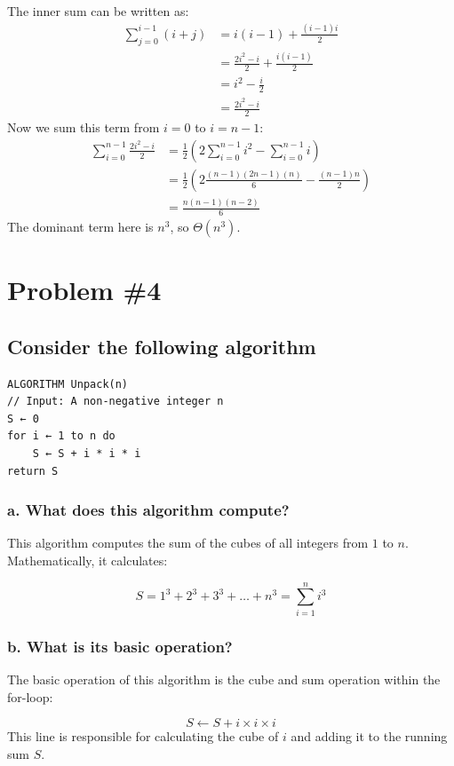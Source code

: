 \documentclass{article}
\begin{document}
The inner sum can be written as:
\[
\begin{aligned}
\sum_{{j=0}}^{{i-1}} (i+j) &= i(i-1) + \frac{(i-1)i}{2} \\
&= \frac{2i^2 - i}{2} + \frac{i(i-1)}{2} \\
&= i^2 - \frac{i}{2} \\
&= \frac{2i^2 - i}{2}
\end{aligned}
\]
Now we sum this term from \( i=0 \) to \( i=n-1 \):
\[
\begin{aligned}
\sum_{{i=0}}^{{n-1}} \frac{2i^2 - i}{2} &= \frac{1}{2} \left( 2\sum_{{i=0}}^{{n-1}} i^2 - \sum_{{i=0}}^{{n-1}} i \right) \\
&= \frac{1}{2} \left( 2\frac{(n-1)(2n-1)(n)}{6} - \frac{(n-1)n}{2} \right) \\
&= \frac{n(n-1)(n-2)}{6}
\end{aligned}
\]
The dominant term here is \( n^3 \), so \( \Theta(n^3) \).

\newpage
\section*{Problem \#4}
\subsection*{Consider the following algorithm}

\begin{verbatim}
ALGORITHM Unpack(n)
// Input: A non-negative integer n
S ← 0
for i ← 1 to n do
    S ← S + i * i * i
return S
\end{verbatim}

\subsubsection*{a. What does this algorithm compute?}

This algorithm computes the sum of the cubes of all integers from \(1\) to \(n\). Mathematically, it calculates:

\[
S = 1^3 + 2^3 + 3^3 + \ldots + n^3 = \sum_{{i=1}}^{n} i^3
\]

\subsubsection*{b. What is its basic operation?}

The basic operation of this algorithm is the cube and sum operation within the for-loop:

\[
S \leftarrow S + i \times i \times i
\]
\newline
This line is responsible for calculating the cube of \(i\) and adding it to the running sum \(S\).
\end{document}
